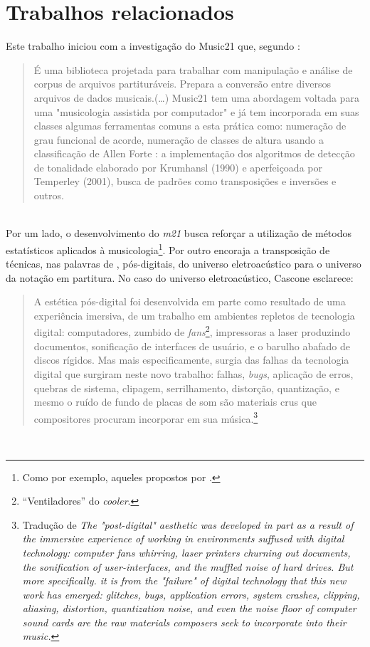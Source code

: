 \section{Trabalhos relacionados}\label{sec:trabalhos}

Este trabalho iniciou com a investigação do Music21 que, segundo \cite{soares_luteria_2015}:
\ \\
\begin{quote}
É uma biblioteca projetada para trabalhar com manipulação e análise de corpus de arquivos partituráveis. Prepara a conversão entre diversos arquivos de dados musicais.(\ldots) Music21 tem uma abordagem voltada para uma "musicologia assistida por computador" e já tem incorporada em suas classes algumas ferramentas comuns a esta prática como: numeração de grau funcional de acorde, numeração de classes de altura usando a classificação de Allen Forte : a implementação dos algoritmos de detecção de tonalidade elaborado por Krumhansl (1990) e aperfeiçoada por Temperley (2001), busca de padrões como transposições e inversões e outros.\cite[p.~71-72]{soares_luteria_2015}
\end{quote}
\ \\

Por um lado, o desenvolvimento do \emph{m21} busca reforçar a utilização de métodos estatísticos aplicados à musicologia\footnote{Como por exemplo, aqueles propostos por \cite{guigue_estetica_2011}.}. Por outro encoraja a transposição de técnicas, nas palavras de  \cite{cascone_aesthetics_2000}, pós-digitais, do universo eletroacústico para o universo da notação em partitura. No caso do universo eletroacústico, Cascone esclarece:
\ \\

\begin{quote}
A estética pós-digital foi desenvolvida em parte como resultado de uma experiência imersiva, de um trabalho em ambientes repletos de tecnologia digital: computadores, zumbido de \emph{fans}\footnote{``Ventiladores'' do \emph{cooler}.}, impressoras a laser produzindo documentos, sonificação de interfaces de usuário, e o barulho abafado de discos rígidos. Mas mais especificamente, surgia das falhas da tecnologia digital que surgiram neste novo trabalho: falhas, \emph{bugs}, aplicação de erros, quebras de sistema, clipagem, serrilhamento, distorção, quantização, e mesmo o ruído de fundo de placas de som são materiais crus que compositores procuram incorporar em sua música.\cite[p.~393]{cascone_aesthetics_2000}\footnote{Tradução de \emph{The "post-digital" aesthetic was developed in part as a result of the immersive experience of working in environments suffused with digital technology: computer fans whirring, laser printers churning out documents, the sonification of user-interfaces, and the muffled noise of hard drives. But more specifically. it is from the "failure" of digital technology that this new work has emerged: glitches, bugs, application errors, system crashes, clipping, aliasing, distortion, quantization noise, and even the noise floor of computer sound cards are the raw materials composers seek to incorporate into their music.}}
\end{quote}
\ \\

